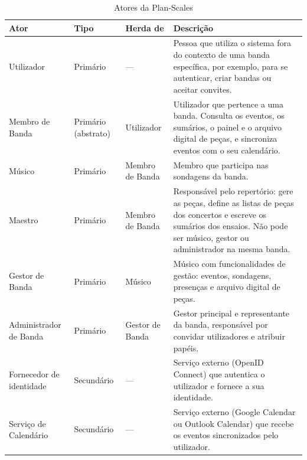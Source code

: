 \begin{table}[h]
\centering
\caption{Atores da Plan-Scales}
\label{tab:atores}
\begin{tabular}{|p{3cm}|p{1.8cm}|p{2.8cm}|p{6.4cm}|}
\hline
\textbf{Ator} & \textbf{Tipo} & \textbf{Herda de} & \textbf{Descrição} \\ \hline
Utilizador & Primário & --- & Pessoa que utiliza o sistema fora do contexto de uma banda específica, por exemplo, para se autenticar, criar bandas ou aceitar convites. \\ \hline
Membro de Banda & Primário (abstrato) & Utilizador & Utilizador que pertence a uma banda. Consulta os eventos, os sumários, o painel e o arquivo digital de peças, e sincroniza eventos com o seu calendário. \\ \hline
Músico & Primário & Membro de Banda & Membro que participa nas sondagens da banda. \\ \hline
Maestro & Primário & Membro de Banda & Responsável pelo repertório: gere as peças, define as listas de peças dos concertos e escreve os sumários dos ensaios. Não pode ser músico, gestor ou administrador na mesma banda. \\ \hline
Gestor de Banda & Primário & Músico & Músico com funcionalidades de gestão: eventos, sondagens, presenças e arquivo digital de peças. \\ \hline
Administrador de Banda & Primário & Gestor de Banda & Gestor principal e representante da banda, responsável por convidar utilizadores e atribuir papéis. \\ \hline
Fornecedor de identidade & Secundário & --- & Serviço externo (OpenID Connect) que autentica o utilizador e fornece a sua identidade. \\ \hline
Serviço de Calendário & Secundário & --- & Serviço externo (Google Calendar ou Outlook Calendar) que recebe os eventos sincronizados pelo utilizador. \\ \hline
\end{tabular}
\end{table}

